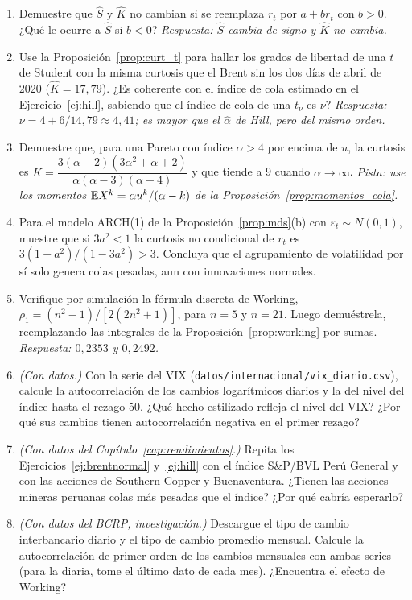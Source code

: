 \begin{enumerate}[label=\textbf{\thechapter.\arabic*},leftmargin=*,itemsep=6pt]
  \item Demuestre que $\hat S$ y $\hat K$ no cambian si se reemplaza $r_t$ por $a+br_t$ con $b>0$. ¿Qué
  le ocurre a $\hat S$ si $b<0$? \textit{Respuesta: $\hat S$ cambia de signo y $\hat K$ no cambia.}

  \item Use la Proposición~\ref{prop:curt_t} para hallar los grados de libertad de una $t$ de Student con
  la misma curtosis que el Brent sin los dos días de abril de 2020 ($\hat K=17{,}79$). ¿Es coherente
  con el índice de cola estimado en el Ejercicio~\ref{ej:hill}, sabiendo que el índice de cola de una
  $t_\nu$ es $\nu$? \textit{Respuesta: $\nu=4+6/14{,}79\approx4{,}41$; es mayor que el $\hat\alpha$ de
  Hill, pero del mismo orden.}

  \item Demuestre que, para una Pareto con índice $\alpha>4$ por encima de $u$, la curtosis es
  $K=\dfrac{3(\alpha-2)(3\alpha^2+\alpha+2)}{\alpha(\alpha-3)(\alpha-4)}$ y que tiende a 9 cuando
  $\alpha\to\infty$. \textit{Pista: use los momentos $\mathbb{E} X^k=\alpha u^k/(\alpha-k)$ de la
  Proposición~\ref{prop:momentos_cola}.}

  \item Para el modelo ARCH(1) de la Proposición~\ref{prop:mds}(b) con $\varepsilon_t\sim N(0,1)$, muestre
  que si $3a^2<1$ la curtosis no condicional de $r_t$ es $3(1-a^2)/(1-3a^2)>3$. Concluya que el
  agrupamiento de volatilidad por sí solo genera colas pesadas, aun con innovaciones normales.

  \item Verifique por simulación la fórmula discreta de Working, $\rho_1=(n^2-1)/[2(2n^2+1)]$, para
  $n=5$ y $n=21$. Luego demuéstrela, reemplazando las integrales de la Proposición~\ref{prop:working} por
  sumas. \textit{Respuesta: $0{,}2353$ y $0{,}2492$.}

  \item \emph{(Con datos.)} Con la serie del VIX (\texttt{datos/internacional/vix\_diario.csv}),
  calcule la autocorrelación de los cambios logarítmicos diarios y la del nivel del índice hasta el
  rezago 50. ¿Qué hecho estilizado refleja el nivel del VIX? ¿Por qué sus cambios tienen autocorrelación
  negativa en el primer rezago?

  \item \emph{(Con datos del Capítulo~\ref{cap:rendimientos}.)} Repita los Ejercicios~\ref{ej:brentnormal}
  y~\ref{ej:hill} con el índice S\&P/BVL Perú General y con las acciones de Southern Copper y
  Buenaventura. ¿Tienen las acciones mineras peruanas colas más pesadas que el índice? ¿Por qué cabría
  esperarlo?

  \item \emph{(Con datos del BCRP, investigación.)} Descargue el tipo de cambio interbancario diario y el
  tipo de cambio promedio mensual. Calcule la autocorrelación de primer orden de los cambios mensuales
  con ambas series (para la diaria, tome el último dato de cada mes). ¿Encuentra el efecto de Working?
\end{enumerate}


